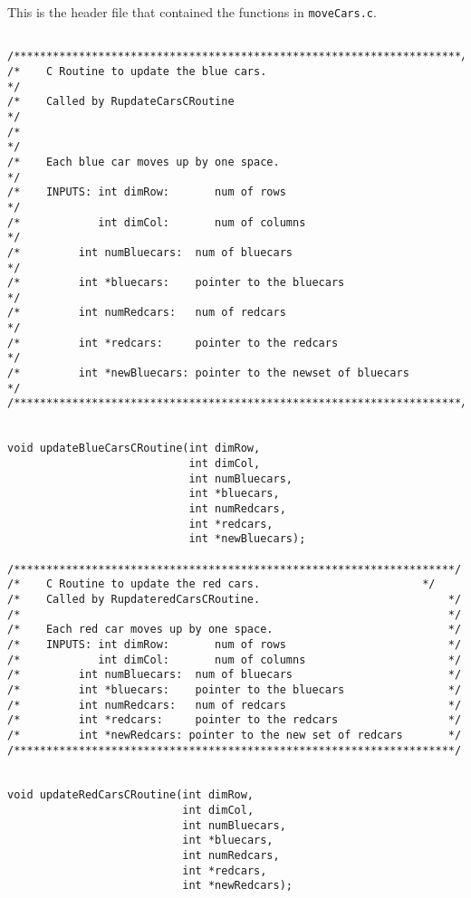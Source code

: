\documentclass[11pt]{article}
\begin{document}
   This is the header file that contained the functions in \verb~moveCars.c~.

\begin{verbatim}

/*********************************************************************/
/*    C Routine to update the blue cars.                             */
/*    Called by RupdateCarsCRoutine                                  */
/*                                                                   */
/*    Each blue car moves up by one space.                           */
/*    INPUTS: int dimRow:       num of rows                          */
/*            int dimCol:       num of columns                       */
/*         int numBluecars:  num of bluecars                         */
/*         int *bluecars:    pointer to the bluecars                 */
/*         int numRedcars:   num of redcars                          */
/*         int *redcars:     pointer to the redcars                  */
/*         int *newBluecars: pointer to the newset of bluecars       */
/*********************************************************************/


void updateBlueCarsCRoutine(int dimRow, 
                            int dimCol,
                            int numBluecars,
                            int *bluecars, 
                            int numRedcars,
                            int *redcars,
                            int *newBluecars);

/********************************************************************/
/*    C Routine to update the red cars.                         */
/*    Called by RupdateredCarsCRoutine.                             */
/*                                                                  */
/*    Each red car moves up by one space.                           */
/*    INPUTS: int dimRow:       num of rows                         */
/*            int dimCol:       num of columns                      */
/*         int numBluecars:  num of bluecars                        */
/*         int *bluecars:    pointer to the bluecars                */
/*         int numRedcars:   num of redcars                         */
/*         int *redcars:     pointer to the redcars                 */
/*         int *newRedcars: pointer to the new set of redcars       */
/********************************************************************/


void updateRedCarsCRoutine(int dimRow,
                           int dimCol,
                           int numBluecars,
                           int *bluecars, 
                           int numRedcars,
                           int *redcars,
                           int *newRedcars);


\end{verbatim}
\end{document}
